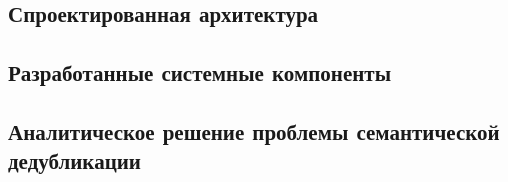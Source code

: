 \subsection{Спроектированная архитектура}
\label{sec:architecture}


\subsection{Разработанные системные компоненты}
\label{sec:components}


\subsection{Аналитическое решение проблемы семантической дедубликации}

